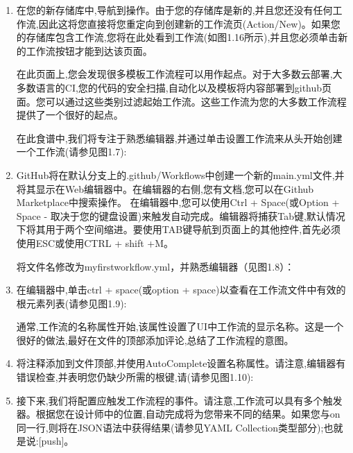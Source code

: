 \begin{enumerate}
\item 
在您的新存储库中,导航到操作。由于您的存储库是新的,并且您还没有任何工作流,因此这将您直接将您重定向到创建新的工作流页(Action/New)。如果您的存储库包含工作流,您将在此处看到工作流(如图1.16所示),并且您必须单击新的工作流按钮才能到达该页面。

在此页面上,您会发现很多模板工作流程可以用作起点。对于大多数云部署,大多数语言的CI,您的代码的安全扫描,自动化以及模板将内容部署到github页面。您可以通过这些类别过滤起始工作流。这些工作流为您的大多数工作流程提供了一个很好的起点。

在此食谱中,我们将专注于熟悉编辑器,并通过单击设置工作流来从头开始创建一个工作流(请参见图1.7):


\item 
GitHub将在默认分支上的.github/Workflows中创建一个新的main.yml文件,并将其显示在Web编辑器中。在编辑器的右侧,您有文档,您可以在Github Marketplace中搜索操作。
在编辑器中,您可以使用Ctrl + Space(或Option + Space - 取决于您的键盘设置)来触发自动完成。编辑器将捕获Tab键,默认情况下将其用于两个空间缩进。要使用TAB键导航到页面上的其他控件,首先必须使用ESC或使用CTRL + shift +M。

将文件名修改为myfirstworkflow.yml，并熟悉编辑器（见图1.8）：


\item 
在编辑器中,单击ctrl + space(或option + space)以查看在工作流文件中有效的根元素列表(请参见图1.9):


通常,工作流的名称属性开始,该属性设置了UI中工作流的显示名称。这是一个很好的做法,最好在文件的顶部添加评论,总结了工作流程的意图。

\item 
将注释添加到文件顶部,并使用AutoComplete设置名称属性。请注意,编辑器有错误检查,并表明您仍缺少所需的根键,请(请参见图1.10):


\item 
接下来,我们将配置应触发工作流程的事件。请注意,工作流可以具有多个触发器。根据您在设计师中的位置,自动完成将为您带来不同的结果。如果您与on同一行,则将在JSON语法中获得结果(请参见YAML Collection类型部分);也就是说:[push]。


\end{enumerate}

